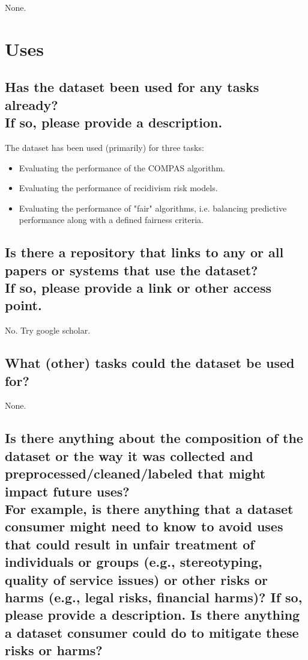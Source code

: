 \documentclass[letterpaper, 10 pt, conference]{ieeeconf}  %
\newcommand{\subtitle}[1]{{\\ \small \normalfont \color{purple} #1}}
\begin{document}
None.

\section{Uses}

\subsection{Has the dataset been used for any tasks already? \subtitle{If so, please provide a description.}}

The dataset has been used (primarily) for three tasks:

\begin{itemize}
    \item Evaluating the performance of the COMPAS algorithm.
    \item Evaluating the performance of recidivism risk models.
    \item Evaluating the performance of "fair" algorithms, i.e. balancing predictive performance along with a defined fairness criteria.
\end{itemize}

\subsection{Is there a repository that links to any or all papers or systems that use the dataset? \subtitle{If so, please provide a link or other access point. }}

No. Try google scholar.

\subsection{What (other) tasks could the dataset be used for?}

None.

\subsection{Is there anything about the composition of the dataset or the way it was collected and preprocessed/cleaned/labeled that might impact future uses? \subtitle{For example, is there anything that a dataset consumer might need to know to avoid uses that could result in unfair treatment of individuals or groups (e.g., stereotyping, quality of service issues) or other risks or harms (e.g., legal risks, financial harms)? If so, please provide a description. Is there anything a dataset consumer could do to mitigate these risks or harms?}}
\end{document}
